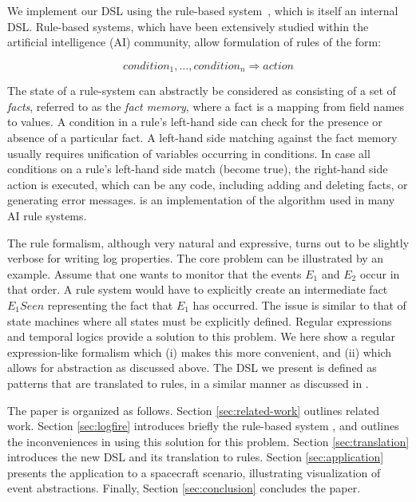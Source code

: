 We implement our DSL using the rule-based \logfire{}
system~\cite{havelund-logfire-sttt14}, which is itself an internal
\scala{} DSL.  Rule-based systems, which have been extensively studied
within the artificial intelligence (AI) community, allow formulation of
rules of the form:

\[
  condition_1, \ldots, condition_n \Rightarrow action
\]

\noindent
The state of a rule-system can abstractly be considered as consisting
of a set of {\em facts}, referred to as the {\em fact memory}, where a
fact is a mapping from field names to values.  A condition in a rule's
left-hand side can check for the presence or absence of a particular
fact. A left-hand side matching against the fact memory usually
requires unification of variables occurring in conditions. In case all
conditions on a rule's left-hand side match (become true), the
right-hand side action is executed, which can be any \scala{} code,
including adding and deleting facts, or generating error
messages. \logfire{} is an implementation of the \rete{} algorithm
\cite{forgy-rete-82} used in many AI rule systems.

The rule formalism, although very natural and expressive, turns out to
be slightly verbose for writing log properties. The core problem
can be illustrated by an example. Assume that one wants to monitor
that the events $E_1$ and $E_2$ occur in that order. A rule system
would have to explicitly create an intermediate fact $E_{1}Seen$
representing the fact that $E_1$ has occurred. The issue is similar to
that of state machines where all states must be explicitly
defined. Regular expressions and temporal logics provide a solution to
this problem. We here show a regular expression-like formalism which
(i) makes this more convenient, and (ii) which allows for abstraction
as discussed above.  The DSL we present is defined as patterns that
are translated to rules, in a similar manner as discussed in
\cite{havelund-logfire-sttt14}.

The paper is organized as follows.
%
Section \ref{sec:related-work} outlines related work.
%
Section \ref{sec:logfire} introduces briefly the rule-based system \logfire{},
and outlines the inconveniences in using this solution for this problem.
%
Section \ref{sec:translation} introduces the new DSL and its translation to rules.
%
Section \ref{sec:application} presents the application to a spacecraft scenario,
illustrating visualization of event abstractions.
%
Finally, Section \ref{sec:conclusion} concludes the paper.
